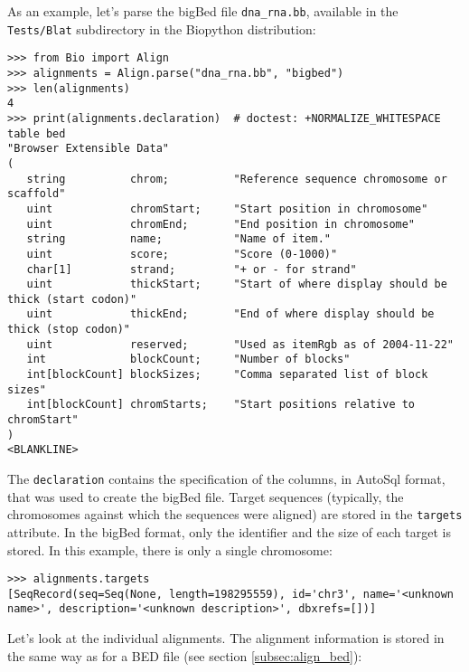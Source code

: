 As an example, let's parse the bigBed file \verb|dna_rna.bb|, available in the \verb|Tests/Blat| subdirectory in the Biopython distribution:
\begin{verbatim}
>>> from Bio import Align
>>> alignments = Align.parse("dna_rna.bb", "bigbed")
>>> len(alignments)
4
>>> print(alignments.declaration)  # doctest: +NORMALIZE_WHITESPACE
table bed
"Browser Extensible Data"
(
   string          chrom;          "Reference sequence chromosome or scaffold"
   uint            chromStart;     "Start position in chromosome"
   uint            chromEnd;       "End position in chromosome"
   string          name;           "Name of item."
   uint            score;          "Score (0-1000)"
   char[1]         strand;         "+ or - for strand"
   uint            thickStart;     "Start of where display should be thick (start codon)"
   uint            thickEnd;       "End of where display should be thick (stop codon)"
   uint            reserved;       "Used as itemRgb as of 2004-11-22"
   int             blockCount;     "Number of blocks"
   int[blockCount] blockSizes;     "Comma separated list of block sizes"
   int[blockCount] chromStarts;    "Start positions relative to chromStart"
)
<BLANKLINE>
\end{verbatim}
The \verb|declaration| contains the specification of the columns, in AutoSql format, that was used to create the bigBed file.
Target sequences (typically, the chromosomes against which the sequences were aligned) are stored in the \verb|targets| attribute. In the bigBed format, only the identifier and the size of each target is stored. In this example, there is only a single chromosome:
\begin{verbatim}
>>> alignments.targets
[SeqRecord(seq=Seq(None, length=198295559), id='chr3', name='<unknown name>', description='<unknown description>', dbxrefs=[])]
\end{verbatim}
Let's look at the individual alignments. The alignment information is stored in the same way as for a BED file (see section \ref{subsec:align_bed}):

